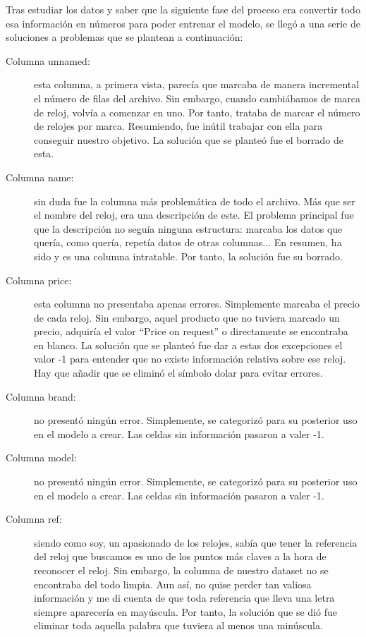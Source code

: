 	Tras estudiar los datos y saber que la siguiente fase del proceso era convertir todo esa información en números para poder entrenar el modelo, se llegó a una serie de soluciones a problemas que se plantean a continuación:
	
\begin{description}
	\item[Columna unnamed:] esta columna, a primera vista, parecía que marcaba de manera incremental el número de filas del archivo. Sin embargo, cuando cambiábamos de marca de reloj, volvía a comenzar en uno. Por tanto, trataba de marcar el número de relojes por marca. Resumiendo, fue inútil trabajar con ella para conseguir nuestro objetivo. La solución que se planteó fue el borrado de esta.
	\item[Columna name:] sin duda fue la columna más problemática de todo el archivo. Más que ser el nombre del reloj, era una descripción de este. El problema principal fue que la descripción no seguía ninguna estructura: marcaba los datos que quería, como quería, repetía datos de otras columnas... En resumen, ha sido y es una columna intratable. Por tanto, la solución fue su borrado.
	\item[Columna price:] esta columna no presentaba apenas errores. Simplemente marcaba el precio de cada reloj. Sin embargo, aquel producto que no tuviera marcado un precio, adquiría el valor “Price on request” o directamente se encontraba en blanco. La solución que se planteó fue dar a estas dos excepciones el valor -1 para entender que no existe información relativa sobre ese reloj. Hay que añadir que se eliminó el símbolo dolar para evitar errores.
	\item[Columna brand:] no presentó ningún error. Simplemente, se categorizó para su posterior uso en el modelo a crear. Las celdas sin información pasaron a valer -1.
	\item[Columna model:] no presentó ningún error. Simplemente, se categorizó para su posterior uso en el modelo a crear. Las celdas sin información pasaron a valer -1.
	\item[Columna ref:] siendo como soy, un apasionado de los relojes, sabía que tener la referencia del reloj que buscamos es uno de los puntos más claves a la hora de reconocer el reloj. Sin embargo, la columna de nuestro dataset no se encontraba del todo limpia. Aun así, no quise perder tan valiosa información y me di cuenta de que toda referencia que lleva una letra siempre aparecería en mayúscula. Por tanto, la solución que se dió fue eliminar toda aquella palabra que tuviera al menos una minúscula.

\end{description}
